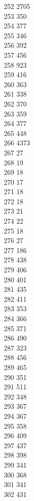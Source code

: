 { 252	2705 \\
 253	350 \\
 254	377 \\
 255	346 \\
 256	392 \\
 257	456 \\
 258	923 \\
 259	416 \\
 260	363 \\
 261	338 \\
 262	370 \\
 263	359 \\
 264	377 \\
 265	448 \\
 266	4373 \\
 267	27 \\
 268	19 \\
 269	18 \\
 270	17 \\
 271	18 \\
 272	18 \\
 273	21 \\
 274	22 \\
 275	18 \\
 276	27 \\
 277	186 \\
 278	438 \\
 279	406 \\
 280	401 \\
 281	435 \\
 282	411 \\
 283	353 \\
 284	366 \\
 285	371 \\
 286	490 \\
 287	323 \\
 288	456 \\
 289	465 \\
 290	351 \\
 291	511 \\
 292	348 \\
 293	367 \\
 294	367 \\
 295	358 \\
 296	409 \\
 297	437 \\
 298	398 \\
 299	341 \\
 300	368 \\
 301	341 \\
 302	431 \\
}
